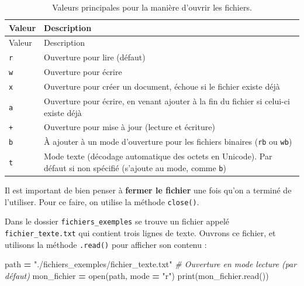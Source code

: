 \documentclass[
  12pt,
]{book}
\newenvironment{Shaded}{\begin{snugshade}}{\end{snugshade}}
\newcommand{\BuiltInTok}[1]{#1}
\newcommand{\CommentTok}[1]{\textcolor[rgb]{0.56,0.35,0.01}{\textit{#1}}}
\newcommand{\NormalTok}[1]{#1}
\newcommand{\OperatorTok}[1]{\textcolor[rgb]{0.81,0.36,0.00}{\textbf{#1}}}
\newcommand{\StringTok}[1]{\textcolor[rgb]{0.31,0.60,0.02}{#1}}
\numberwithin{equation}{section}
\numberwithin{countremarque}{section}
\begin{document}
\begin{longtable}[]{@{}
  >{\raggedleft\arraybackslash}p{}
  >{\raggedleft\arraybackslash}p{}@{}}
\caption{\label{tab:open-mode-ouverture} Valeurs principales pour la manière d'ouvrir les fichiers.}\tabularnewline
\toprule\noalign{}
\begin{minipage}[b]{\linewidth}\raggedleft
Valeur
\end{minipage} & \begin{minipage}[b]{\linewidth}\raggedleft
Description
\end{minipage} \\
\midrule\noalign{}
\endfirsthead
\toprule\noalign{}
\begin{minipage}[b]{\linewidth}\raggedleft
Valeur
\end{minipage} & \begin{minipage}[b]{\linewidth}\raggedleft
Description
\end{minipage} \\
\midrule\noalign{}
\endhead
\bottomrule\noalign{}
\endlastfoot
\texttt{r} & Ouverture pour lire (défaut) \\
\texttt{w} & Ouverture pour écrire \\
\texttt{x} & Ouverture pour créer un document, échoue si le fichier existe déjà \\
\texttt{a} & Ouverture pour écrire, en venant ajouter à la fin du fichier si celui-ci existe déjà \\
\texttt{+} & Ouverture pour mise à jour (lecture et écriture) \\
\texttt{b} & À ajouter à un mode d'ouverture pour les fichiers binaires (\texttt{rb} ou \texttt{wb}) \\
\texttt{t} & Mode texte (décodage automatique des octets en Unicode). Par défaut si non spécifié (s'ajoute au mode, comme \texttt{b}) \\
\end{longtable}

Il est important de bien penser à \textbf{fermer le fichier} une fois qu'on a terminé de l'utiliser. Pour ce faire, on utilise la méthode \texttt{close()}.

Dans le dossier \texttt{fichiers\_exemples} se trouve un fichier appelé \texttt{fichier\_texte.txt} qui contient trois lignes de texte. Ouvrons ce fichier, et utilisons la méthode \texttt{.read()} pour afficher son contenu :

\begin{Shaded}
\begin{Highlighting}[]
\NormalTok{path }\OperatorTok{=} \StringTok{"./fichiers\_exemples/fichier\_texte.txt"}
\CommentTok{\# Ouverture en mode lecture (par défaut)}
\NormalTok{mon\_fichier }\OperatorTok{=} \BuiltInTok{open}\NormalTok{(path, mode }\OperatorTok{=} \StringTok{"r"}\NormalTok{)}
\BuiltInTok{print}\NormalTok{(mon\_fichier.read())}
\end{Highlighting}
\end{Shaded}
\end{document}
